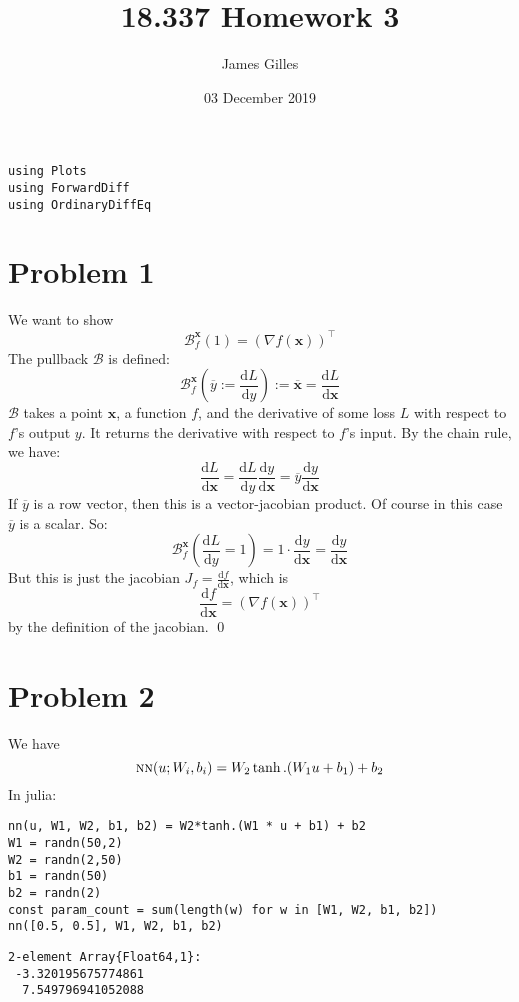 \documentclass[11pt]{article}
\author{James Gilles}
\date{03 December 2019}
\title{18.337 Homework 3}
\newcommand{\B}[0]{\mathcal{B}}
\newcommand{\xv}[0]{\mathbf{x}}
\newcommand*\lgrad[1]{\overline{#1}}
\newcommand*\tderiv[2]{\frac{\mathrm{d}#1}{\mathrm{d}#2}}
\newcommand{\NN}[0]{\textsc{nn}}
\newcommand{\transpose}[1]{#1 ^\top}
\renewcommand*{\tableofcontents}[0]{}
\begin{document}
\maketitle
\tableofcontents

\begin{verbatim}
using Plots
using ForwardDiff
using OrdinaryDiffEq
\end{verbatim}

\section{Problem 1}
\label{sec:org8290364}
We want to show
$$\B_f^\xv(1) = \transpose{(\nabla f(\xv))}$$
The pullback \(\B\) is defined:
$$\B^\xv_f(\lgrad{y} := \tderiv{L}{y}) := \lgrad{\xv} = \tderiv{L}{\xv}$$
\(\B\) takes a point \(\xv\), a function \(f\), and the derivative of some loss \(L\) with respect to \(f\)'s output \(y\).
It returns the derivative with respect to \(f\)'s input.
By the chain rule, we have:
$$\tderiv{L}{\xv} = \tderiv{L}{y}\tderiv{y}{\xv} = \lgrad{y} \tderiv{y}{\xv}$$
If \(\lgrad{y}\) is a row vector, then this is a vector-jacobian product. Of course in this case \(\lgrad{y}\) is a scalar.
So:
$$\B^\xv_f(\tderiv{L}{y} = 1) = 1 \cdot \tderiv{y}{\xv} = \tderiv{y}{\xv}$$
But this is just the jacobian \(J_f=\tderiv{f}{\xv}\), which is
$$\tderiv{f}{\xv}=\transpose{(\nabla f(\xv))}$$
by the definition of the jacobian. \qed
\section{Problem 2}
\label{sec:orgd8c4808}
We have $$\NN(u; W_i, b_i) = W_2 \tanh.(W_1 u + b_1) + b_2$$
In julia:
\begin{verbatim}
nn(u, W1, W2, b1, b2) = W2*tanh.(W1 * u + b1) + b2
W1 = randn(50,2)
W2 = randn(2,50)
b1 = randn(50)
b2 = randn(2)
const param_count = sum(length(w) for w in [W1, W2, b1, b2])
nn([0.5, 0.5], W1, W2, b1, b2)
\end{verbatim}

\begin{verbatim}
2-element Array{Float64,1}:
 -3.320195675774861
  7.549796941052088
\end{verbatim}
\end{document}

